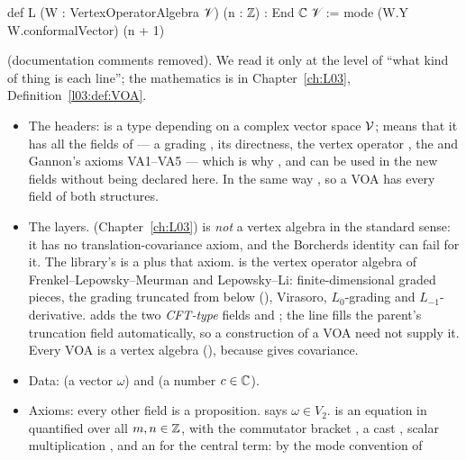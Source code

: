 \begin{example}
\begin{leancode}
def L (W : VertexOperatorAlgebra 𝒱) (n : ℤ) : End ℂ 𝒱 :=
  mode (W.Y W.conformalVector) (n + 1)
\end{leancode}
(documentation comments removed). We read it only at the level of ``what kind of thing is each
line''; the mathematics is in Chapter~\ref{ch:L03}, Definition~\ref{l03:def:VOA}.
\begin{itemize}
\item The headers:  is a type depending on a complex vector space
  $\mathcal{V}$;  means that it has all the fields of
   --- a grading , its directness, the
  vertex operator , the  and Gannon's axioms VA1--VA5
  --- which is why ,  and  can be used in the new fields
  without being declared here. In the same way  , so a VOA has every field of both structures.
\item The layers.  (Chapter~\ref{ch:L03}) is \emph{not} a vertex algebra in the
  standard sense: it has no translation-covariance axiom, and the Borcherds identity can fail for it.
  The library's  is a  plus that axiom.
   is the vertex operator algebra of Frenkel--Lepowsky--Meurman and
  Lepowsky--Li: finite-dimensional graded pieces, the grading truncated from below
  (), Virasoro, $L_0$-grading and $L_{-1}$-derivative.
   adds the two \emph{CFT-type} fields  and
  ; the line  fills the parent's truncation
  field automatically, so a construction of a VOA need not supply it. Every VOA is a vertex algebra
  (), because  gives covariance.
\item Data:  (a vector $\omega$) and  (a number
  $c\in{\mathbb{C}}$).
\item Axioms: every other field is a proposition.  says $\omega\in V_2$.
   is an equation in  quantified over all $m,n\in{\mathbb{Z}}$, with the
  commutator bracket , a cast , scalar multiplication , and an
   for the central term: by the mode convention of

\end{itemize}
\end{example}
